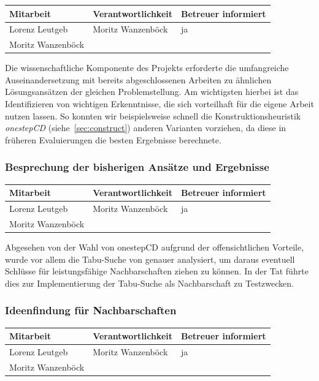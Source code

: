 \begin{center}
\begin{tabular}{lll}
	Mitarbeit & Verantwortlichkeit & Betreuer informiert \\
	\hline
	Lorenz Leutgeb & Moritz Wanzenböck & ja \\
	Moritz Wanzenböck & & \\
\end{tabular}
\end{center}

Die wissenschaftliche Komponente des Projekts erforderte die umfangreiche Auseinandersetzung mit bereits abgeschlossenen Arbeiten zu ähnlichen Lösungsansätzen der gleichen Problemstellung. Am wichtigsten hierbei ist das Identifizieren von wichtigen Erkenntnisse, die sich vorteilhaft für die eigene Arbeit nutzen lassen. So konnten wir beispielsweise schnell die Konstruktionsheuristik \textit{onestepCD} (siehe~\ref{sec:construct}) anderen Varianten vorziehen, da diese in früheren Evaluierungen die besten Ergebnisse berechnete.

\subsubsection{Besprechung der bisherigen Ansätze und Ergebnisse}

\begin{center}
\begin{tabular}{lll}
	Mitarbeit & Verantwortlichkeit & Betreuer informiert \\
	\hline
	Lorenz Leutgeb & Moritz Wanzenböck & ja \\
	Moritz Wanzenböck & & \\
\end{tabular}
\end{center}

Abgesehen von der Wahl von onestepCD aufgrund der offensichtlichen Vorteile, wurde vor allem die Tabu-Suche von genauer analysiert, um daraus eventuell Schlüsse für leistungsfähige Nachbarschaften ziehen zu können. In der Tat führte dies zur Implementierung der Tabu-Suche als Nachbarschaft zu Testzwecken. %

\subsubsection{Ideenfindung für Nachbarschaften}

\begin{center}
\begin{tabular}{lll}
	Mitarbeit & Verantwortlichkeit & Betreuer informiert \\
	\hline
	Lorenz Leutgeb & Moritz Wanzenböck & ja \\
	Moritz Wanzenböck & & \\
\end{tabular}
\end{center}


